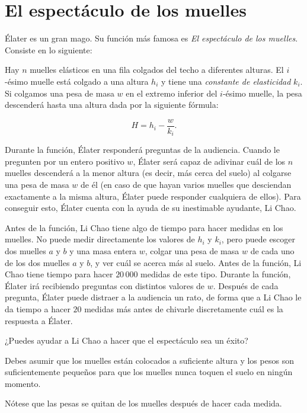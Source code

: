 \documentclass[10.5pt]{article}
\begin{document}
\section*{El espect\'aculo de los muelles}

\'Elater es un gran mago. Su funci\'on m\'as famosa es \textit{El espect\'aculo de los muelles}. Consiste en lo siguiente: 

Hay $n$ muelles el\'asticos en una fila colgados del techo a diferentes alturas. El $i$-\'esimo muelle est\'a colgado a una altura $h_i$ y tiene una \textit{constante de elasticidad} $k_i$. Si colgamos una pesa de masa $w$ en el extremo inferior del $i$-\'esimo muelle, la pesa descender\'a hasta una altura dada por la siguiente f\'ormula:

$$H = h_i - \frac{w}{k_i}\text{.}$$

Durante la funci\'on, \'Elater responder\'a preguntas de la audiencia. Cuando le pregunten por un entero positivo $w$, \'Elater ser\'a capaz de adivinar cu\'al de los $n$ muelles descender\'a a la menor altura (es decir, m\'as cerca del suelo) al colgarse una pesa de masa $w$ de \'el (en caso de que hayan varios muelles que desciendan exactamente a la misma altura, \'Elater puede responder cualquiera de ellos). Para conseguir esto, \'Elater cuenta con la ayuda de su inestimable ayudante, Li Chao.

Antes de la funci\'on, Li Chao tiene algo de tiempo para hacer medidas en los muelles. No puede medir directamente los valores de $h_i$ y $k_i$, pero puede escoger dos muelles $a$ y $b$ y una masa entera $w$, colgar una pesa de masa $w$ de cada uno de los dos muelles $a$ y $b$, y ver cu\'al se acerca m\'as al suelo. Antes de la funci\'on, Li Chao tiene tiempo para hacer $20\,000$ medidas de este tipo. Durante la funci\'on, \'Elater ir\'a recibiendo preguntas con distintos valores de $w$. Despu\'es de cada pregunta, \'Elater puede distraer a la audiencia un rato, de forma que a Li Chao le da tiempo a hacer $20$ medidas m\'as antes de chivarle discretamente cu\'al es la respuesta a \'Elater.

¿Puedes ayudar a Li Chao a hacer que el espect\'aculo sea un \'exito?

\small{
Debes asumir que los muelles est\'an colocados a suficiente altura y los pesos son suficientemente peque\~nos para que los muelles nunca toquen el suelo en ning\'un momento. 

N\'otese que las pesas se quitan de los muelles despu\'es de hacer cada medida.
}
\end{document}
